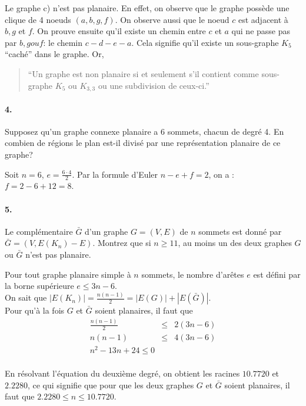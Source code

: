 \begin{solution}
  Le graphe c) n'est pas planaire.
  En effet, on observe que le graphe possède une clique de 4 noeuds $(a,b,g,f)$.
  On observe aussi que le noeud $c$ est adjacent à $b, g$ et $f$.
  On prouve ensuite qu'il existe un chemin entre $c$ et $a$ qui ne passe pas par $b, g ou f$:
  le chemin $c-d-e-a$. Cela signifie qu'il existe un sous-graphe $K_5$ ``caché'' dans le graphe. Or,

  \begin{quotation}
    ``Un graphe est non planaire si et seulement s’il contient comme sous-graphe $K_5$ ou $K_{3,3}$ ou une subdivision de ceux-ci.''
  \end{quotation}

\end{solution}

\paragraph{4. } Supposez qu’un graphe connexe planaire a 6 sommets, chacun de degré 4. En combien de régions le plan est-il divisé par une représentation planaire de ce graphe?

\begin{solution} Soit $n = 6$, $e = \frac{6 \cdot 4}{2}$. Par la formule d'Euler $ n - e + f = 2$, on a : $f = 2 - 6 + 12 = 8$.
\end{solution}

\paragraph{5. } Le complémentaire $\bar{G}$ d’un graphe $G = (V,E)$ de $n$ sommets est donné par $\bar{G} = (V, E(K_n) - E)$. Montrez que si $n \geq 11$, au moins un des deux graphes $G$ ou $\bar{G}$ n’est pas planaire.

\begin{solution} Pour tout graphe planaire simple à $n$ sommets, le nombre d'arêtes $e$ est défini par la borne supérieure  $e \leq 3n - 6$. \\
On sait que $|E(K_{n})| = \frac{n(n-1)}{2} = |E(G)| + |E(\bar{G})|$. \\
Pour qu'à la fois $G$ et $\bar{G}$ soient planaires, il faut que 
\[ \begin{array}{rcl}
 \frac{n(n-1)}{2} &\leq& 2 (3n - 6) \\
  n(n-1) &\leq& 4(3n - 6) \\
  n^2 - 13n + 24 \leq 0 \\
 \end{array} \]
 
 En résolvant l'équation du deuxième degré, on obtient les racines $10.7720$ et $2.2280$, ce qui signifie que pour que les deux graphes $G$ et $\bar{G}$ soient planaires, il faut que $2.2280 \leq n \leq 10.7720$.
 \end{solution}

